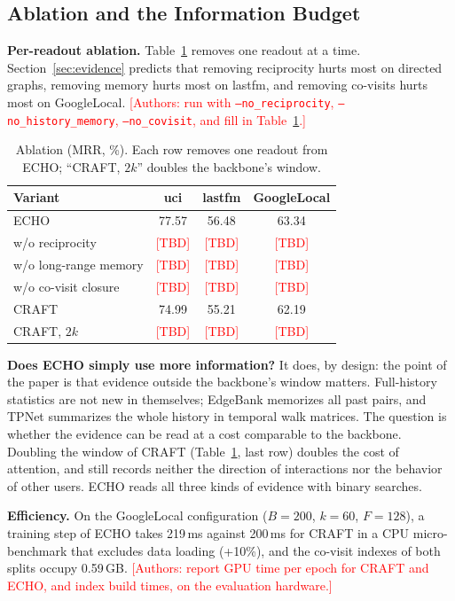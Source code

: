\documentclass[twoside]{article}
\newcommand{\ours}{ECHO}
\newcommand{\tbd}[1][TBD]{\textcolor{red}{[#1]}}
\begin{document}
\subsection{Ablation and the Information Budget}

\textbf{Per-readout ablation.} Table~\ref{tab:ablation} removes one readout at a time. Section~\ref{sec:evidence} predicts that removing reciprocity hurts most on directed graphs, removing memory hurts most on lastfm, and removing co-visits hurts most on GoogleLocal. \tbd[Authors: run with \texttt{--no\_reciprocity}, \texttt{--no\_history\_memory}, \texttt{--no\_covisit}, and fill in Table~\ref{tab:ablation}.]

\begin{table}[t]
\caption{Ablation (MRR, \%). Each row removes one readout from \ours{}; ``CRAFT, $2k$'' doubles the backbone's window.}
\label{tab:ablation}
\begin{center}
\small
\setlength{\tabcolsep}{3pt}
\begin{tabular}{lccc}
\toprule
Variant & uci & lastfm & GoogleLocal \\
\midrule
\ours{} & 77.57 & 56.48 & 63.34 \\
\quad w/o reciprocity & \tbd & \tbd & \tbd \\
\quad w/o long-range memory & \tbd & \tbd & \tbd \\
\quad w/o co-visit closure & \tbd & \tbd & \tbd \\
CRAFT & 74.99 & 55.21 & 62.19 \\
CRAFT, $2k$ & \tbd & \tbd & \tbd \\
\bottomrule
\end{tabular}
\end{center}
\end{table}

\textbf{Does \ours{} simply use more information?} It does, by design: the point of the paper is that evidence outside the backbone's window matters. Full-history statistics are not new in themselves; EdgeBank \citep{poursafaei2022towards} memorizes all past pairs, and TPNet \citep{lu2024tpnet} summarizes the whole history in temporal walk matrices. The question is whether the evidence can be read at a cost comparable to the backbone. Doubling the window of CRAFT (Table~\ref{tab:ablation}, last row) doubles the cost of attention, and still records neither the direction of interactions nor the behavior of other users. \ours{} reads all three kinds of evidence with binary searches.

\textbf{Efficiency.} On the GoogleLocal configuration ($B=200$, $k=60$, $F=128$), a training step of \ours{} takes 219\,ms against 200\,ms for CRAFT in a CPU micro-benchmark that excludes data loading (+10\%), and the co-visit indexes of both splits occupy 0.59\,GB. \tbd[Authors: report GPU time per epoch for CRAFT and ECHO, and index build times, on the evaluation hardware.]
\end{document}

